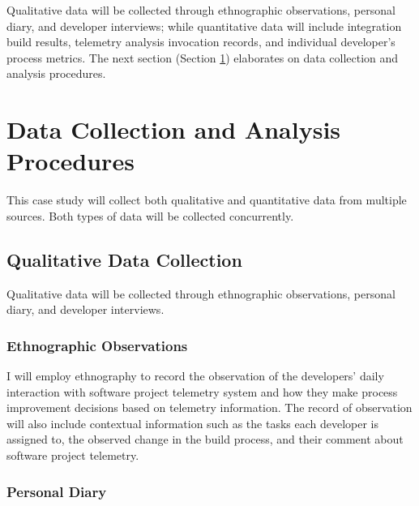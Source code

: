 Qualitative data will be collected through ethnographic observations, personal diary, and developer interviews; while quantitative data will include integration build results, telemetry analysis invocation records, and individual developer's process metrics. The next section (Section \ref{EvaluationInCSDL:DataAnalysis}) elaborates on data collection and analysis procedures.





\section{Data Collection and Analysis Procedures}  \label{EvaluationInCSDL:DataAnalysis}

This case study will collect both qualitative and quantitative data from multiple sources.
Both types of data will be collected concurrently.

\subsection{Qualitative Data Collection}

Qualitative data will be collected through ethnographic observations, personal diary, and developer interviews.


\subsubsection{Ethnographic Observations}

I will employ ethnography to record the observation of the developers' daily interaction with software project telemetry system and how they make process improvement decisions based on telemetry information. The record of observation will also include contextual information such as the tasks each developer is assigned to, the observed change in the build process, and their comment about software project telemetry.

	
\subsubsection{Personal Diary}

